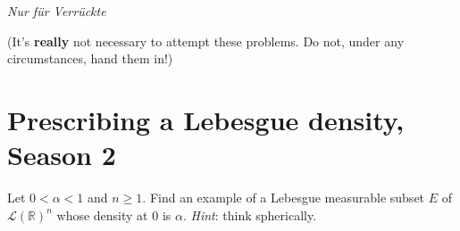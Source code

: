 \documentclass{qlnotes-export}
\begin{document}
\emph{Nur für Verrückte}

(It's \textbf{really} not necessary to attempt these problems. Do not, under any circumstances, hand them in!)

\section{Prescribing a Lebesgue density, Season 2}\label{prescribing-a-lebesgue-density-season-2}

Let \(0 < \alpha < 1\) and \(n \geq 1\). Find an example of a Lebesgue measurable subset \(E\) of \(\mathcal{L}({\mathbb{R}})^{n}\) whose density at \(0\) is \(\alpha\). \emph{Hint}: think spherically.
\end{document}
